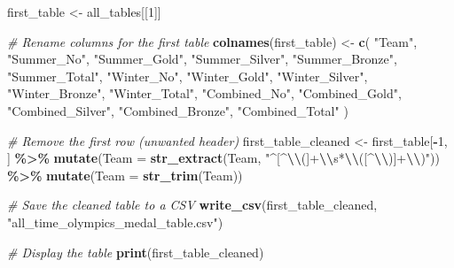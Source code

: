 \documentclass[
]{article}
\newenvironment{Shaded}{\begin{snugshade}}{\end{snugshade}}
\newcommand{\AttributeTok}[1]{\textcolor[rgb]{0.13,0.29,0.53}{#1}}
\newcommand{\CommentTok}[1]{\textcolor[rgb]{0.56,0.35,0.01}{\textit{#1}}}
\newcommand{\DecValTok}[1]{\textcolor[rgb]{0.00,0.00,0.81}{#1}}
\newcommand{\FunctionTok}[1]{\textcolor[rgb]{0.13,0.29,0.53}{\textbf{#1}}}
\newcommand{\NormalTok}[1]{#1}
\newcommand{\OtherTok}[1]{\textcolor[rgb]{0.56,0.35,0.01}{#1}}
\newcommand{\SpecialCharTok}[1]{\textcolor[rgb]{0.81,0.36,0.00}{\textbf{#1}}}
\newcommand{\StringTok}[1]{\textcolor[rgb]{0.31,0.60,0.02}{#1}}
\begin{document}
\begin{Shaded}
\begin{Highlighting}[]
\NormalTok{first\_table }\OtherTok{\textless{}{-}}\NormalTok{ all\_tables[[}\DecValTok{1}\NormalTok{]]}

\CommentTok{\# Rename columns for the first table}
\FunctionTok{colnames}\NormalTok{(first\_table) }\OtherTok{\textless{}{-}} \FunctionTok{c}\NormalTok{(}
  \StringTok{"Team"}\NormalTok{,}
  \StringTok{"Summer\_No"}\NormalTok{,}
  \StringTok{"Summer\_Gold"}\NormalTok{,}
  \StringTok{"Summer\_Silver"}\NormalTok{,}
  \StringTok{"Summer\_Bronze"}\NormalTok{,}
  \StringTok{"Summer\_Total"}\NormalTok{,}
  \StringTok{"Winter\_No"}\NormalTok{,}
  \StringTok{"Winter\_Gold"}\NormalTok{,}
  \StringTok{"Winter\_Silver"}\NormalTok{,}
  \StringTok{"Winter\_Bronze"}\NormalTok{,}
  \StringTok{"Winter\_Total"}\NormalTok{,}
  \StringTok{"Combined\_No"}\NormalTok{,}
  \StringTok{"Combined\_Gold"}\NormalTok{,}
  \StringTok{"Combined\_Silver"}\NormalTok{,}
  \StringTok{"Combined\_Bronze"}\NormalTok{,}
  \StringTok{"Combined\_Total"}
\NormalTok{)}

\CommentTok{\# Remove the first row (unwanted header)}
\NormalTok{first\_table\_cleaned }\OtherTok{\textless{}{-}}\NormalTok{ first\_table[}\SpecialCharTok{{-}}\DecValTok{1}\NormalTok{, ] }\SpecialCharTok{\%\textgreater{}\%}
  \FunctionTok{mutate}\NormalTok{(}\AttributeTok{Team =} \FunctionTok{str\_extract}\NormalTok{(Team, }\StringTok{"\^{}[\^{}}\SpecialCharTok{\textbackslash{}\textbackslash{}}\StringTok{(]+}\SpecialCharTok{\textbackslash{}\textbackslash{}}\StringTok{s*}\SpecialCharTok{\textbackslash{}\textbackslash{}}\StringTok{([\^{}}\SpecialCharTok{\textbackslash{}\textbackslash{}}\StringTok{)]+}\SpecialCharTok{\textbackslash{}\textbackslash{}}\StringTok{)"}\NormalTok{)) }\SpecialCharTok{\%\textgreater{}\%}
  \FunctionTok{mutate}\NormalTok{(}\AttributeTok{Team =} \FunctionTok{str\_trim}\NormalTok{(Team)) }

\CommentTok{\# Save the cleaned table to a CSV}
\FunctionTok{write\_csv}\NormalTok{(first\_table\_cleaned, }\StringTok{"all\_time\_olympics\_medal\_table.csv"}\NormalTok{)}

\CommentTok{\# Display the table}
\FunctionTok{print}\NormalTok{(first\_table\_cleaned)}
\end{Highlighting}
\end{Shaded}
\end{document}

